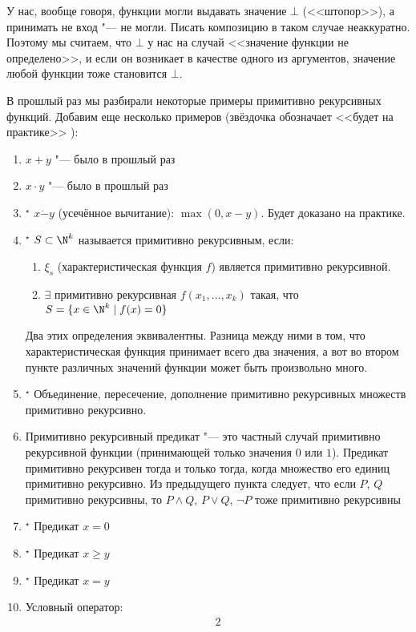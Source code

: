 \begin{Rem}
	У нас, вообще говоря, функции могли выдавать значение $\bot$ (<<штопор>>), а принимать не вход "--- не могли.
	Писать композицию в таком случае неаккуратно.
	Поэтому мы считаем, что $\bot$ у нас на случай <<значение функции не определено>>, и если он возникает в качестве одного из аргументов, значение любой функции тоже становится $\bot$.
\end{Rem}

В прошлый раз мы разбирали некоторые примеры примитивно рекурсивных функций.
Добавим еще несколько примеров (звёздочка обозначает <<будет на практике>> \TODO):
\begin{enumerate}
	\item $x + y$ "--- было в прошлый раз
	\item $x \cdot y$ "--- было в прошлый раз
	\item$^\star$ $x \dot- y$ (усечённое вычитание): $\max(0, x - y)$. Будет доказано на практике.
	\item$^\star$ $S \subset \N^k$ называется примитивно рекурсивным, если:
		\begin{enumerate}
		\item $\xi_s$ (характеристическая функция $f$) является примитивно рекурсивной.
		\item $\exists$ примитивно рекурсивная $f(x_1, \dots, x_k)$ такая, что $S = \{ x \in \N^k \mid f(x) = 0\}$
		\end{enumerate}
		Два этих определения эквивалентны.
		Разница между ними в том, что характеристическая функция принимает всего два значения,
		а вот во втором пункте различных значений функции может быть произвольно много.
	\item$^\star$ Объединение, пересечение, дополнение примитивно рекурсивных множеств примитивно рекурсивно.
	\item Примитивно рекурсивный предикат "--- это частный случай примитивно рекурсивной функции (принимающей только значения $0$ или $1$).
		Предикат примитивно рекурсивен тогда и только тогда, когда множество его единиц примитивно рекурсивно.
		Из предыдущего пункта следует, что если $P$, $Q$ примитивно рекурсивны, то $P\land Q$, $P\lor Q$, $\lnot P$
		тоже примитивно рекурсивны
	\item$^\star$ Предикат $x=0$
	\item$^\star$ Предикат $x\ge y$
	\item$^\star$ Предикат $x=y$
	\item Условный оператор:
		\begin{alignat*}{2}

\end{alignat*}
\end{enumerate}
